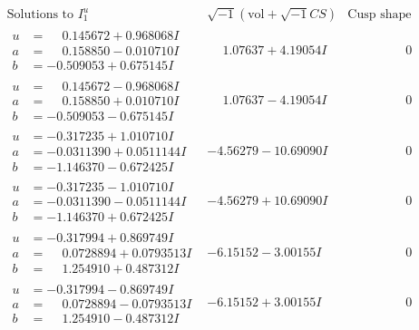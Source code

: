 \documentclass[1p]{elsarticle_modified}
\theoremstyle{definition}
\newcommand{\I}{\sqrt{-1}}
\begin{document}
$$\begin{array}{c|c|c}  
\text{Solutions to }I^u_{1}& \I (\text{vol} + \sqrt{-1}CS) & \text{Cusp shape}\\
 \hline 
\begin{aligned}
u &= \phantom{-}0.145672 + 0.968068 I \\
a &= \phantom{-}0.158850 - 0.010710 I \\
b &= -0.509053 + 0.675145 I\end{aligned}
 & \phantom{-}1.07637 + 4.19054 I & \phantom{-0.000000 } 0 \\ \hline\begin{aligned}
u &= \phantom{-}0.145672 - 0.968068 I \\
a &= \phantom{-}0.158850 + 0.010710 I \\
b &= -0.509053 - 0.675145 I\end{aligned}
 & \phantom{-}1.07637 - 4.19054 I & \phantom{-0.000000 } 0 \\ \hline\begin{aligned}
u &= -0.317235 + 1.010710 I \\
a &= -0.0311390 + 0.0511144 I \\
b &= -1.146370 - 0.672425 I\end{aligned}
 & -4.56279 - 10.69090 I & \phantom{-0.000000 } 0 \\ \hline\begin{aligned}
u &= -0.317235 - 1.010710 I \\
a &= -0.0311390 - 0.0511144 I \\
b &= -1.146370 + 0.672425 I\end{aligned}
 & -4.56279 + 10.69090 I & \phantom{-0.000000 } 0 \\ \hline\begin{aligned}
u &= -0.317994 + 0.869749 I \\
a &= \phantom{-}0.0728894 + 0.0793513 I \\
b &= \phantom{-}1.254910 + 0.487312 I\end{aligned}
 & -6.15152 - 3.00155 I & \phantom{-0.000000 } 0 \\ \hline\begin{aligned}
u &= -0.317994 - 0.869749 I \\
a &= \phantom{-}0.0728894 - 0.0793513 I \\
b &= \phantom{-}1.254910 - 0.487312 I\end{aligned}
 & -6.15152 + 3.00155 I & \phantom{-0.000000 } 0 \\ \hline\begin{aligned}

\end{aligned}
\end{array}$$
\end{document}

